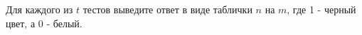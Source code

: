 Для каждого из $t$ тестов выведите ответ в виде таблички $n$ на $m$, где 1 - черный цвет, а 0 - белый.